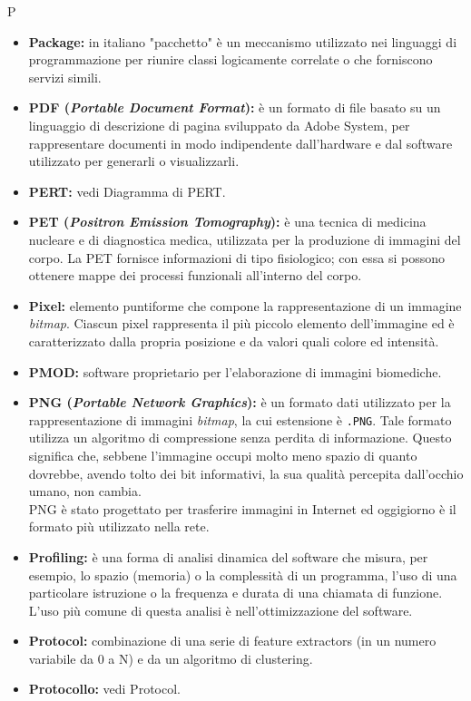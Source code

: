 \Huge P
\normalsize
\begin{itemize}
\item\textbf{Package:} in italiano "pacchetto" è un meccanismo utilizzato nei linguaggi di programmazione per riunire classi logicamente correlate o che forniscono servizi simili.
\item\textbf{PDF (\textit{Portable Document Format}):} è un formato di file basato su un linguaggio di descrizione di pagina sviluppato da Adobe System, per rappresentare documenti in modo indipendente dall'hardware e dal software utilizzato per generarli o visualizzarli.

\item\textbf{PERT:} vedi Diagramma di PERT\glossario{}.

\item\textbf{PET (\textit{Positron Emission Tomography}):} è una tecnica di medicina nucleare e di diagnostica medica, utilizzata per la produzione di immagini del corpo. La PET fornisce informazioni di tipo fisiologico; con essa si possono ottenere mappe dei processi funzionali all'interno del corpo.

\item\textbf{Pixel:} elemento puntiforme che compone la rappresentazione di un immagine \textit{bitmap}\glossario{}. Ciascun pixel\glossario{} rappresenta il più piccolo elemento dell'immagine ed è caratterizzato dalla propria posizione e da valori quali colore ed intensità.

\item\textbf{PMOD:} software proprietario per l'elaborazione di immagini biomediche.

\item\textbf{PNG (\textit{Portable Network Graphics}):} è un formato dati utilizzato per la rappresentazione di immagini \textit{bitmap}\glossario{}, la cui estensione è \verb!.PNG!. Tale formato utilizza un algoritmo di compressione senza perdita di informazione. Questo significa che, sebbene l'immagine occupi molto meno spazio di quanto dovrebbe, avendo tolto dei bit informativi, la sua qualità percepita dall'occhio umano, non cambia.
\\PNG\glossario{} è stato progettato per trasferire immagini in Internet ed oggigiorno è il formato più utilizzato nella rete.

\item\textbf{Profiling:} è una forma di analisi dinamica del software che misura, per esempio, lo spazio (memoria) o la complessità di un programma, l'uso di una particolare istruzione o la frequenza e durata di una chiamata di funzione. L'uso più comune di questa analisi è nell'ottimizzazione del software.

\item\textbf{Protocol:} combinazione di una serie di feature extractors\glossario{} (in un numero variabile da 0 a N) e da un algoritmo di clustering\glossario{}.

\item\textbf{Protocollo:} vedi Protocol\glossario{}.
\end{itemize}
\pagebreak

